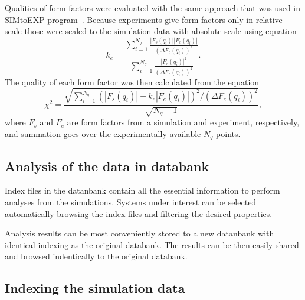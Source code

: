 \documentclass[fleqn,10pt]{wlscirep}
\begin{document}
Qualities of form factors were evaluated with the same approach that was used in SIMtoEXP program~\cite{kucerka10}. Because experiments give form factors only in relative scale those were scaled to the simulation data with absolute scale using equation
\begin{equation}
    k_e = \frac{\sum_{i=1}^{N_q} \frac{|F_s(q_i)||F_e(q_i)|}{(\Delta F_e(q_i))^2}}{\sum_{i=1}^{N_q} \frac{|F_e(q_i)|^2}{(\Delta F_e(q_i))^2}}.
\end{equation}
The quality of each form factor was then calculated from the equation
\begin{equation}
    \chi^2 = \frac{\sqrt{\sum_{i=1}^{N_q}(|F_s(q_i)|-k_e|F_e(q_i)|)^2/(\Delta F_e(q_i))^2}}{\sqrt{N_q-1}},
\end{equation}
where $F_s$ and $F_e$ are form factors from a simulation and experiment, respectively, and summation goes over the experimentally available $N_q$ points. 



\subsection{Analysis of the data in databank}

Index files in the datanbank contain all the essential information to perform analyses from the simulations. Systems under interest can be selected automatically browsing the index files and filtering the desired properties. 

Analysis results can be most conveniently stored to a new datanbank with identical indexing as the original databank. The results can be then easily shared and browsed indentically to the original databank.

\subsection{Indexing the simulation data}
\end{document}
